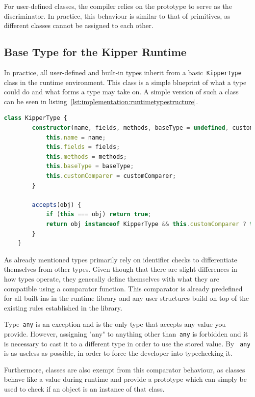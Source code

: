 For user-defined classes, the compiler relies on the prototype to serve as the discriminator. In practice, this behaviour is similar to that of primitives, as different classes cannot be assigned to each other.

\subsection{Base Type for the Kipper Runtime}
\label{subsec:basetype}

In practice, all user-defined and built-in types inherit from a basic~\lstinline|KipperType| class in the runtime environment. This class is a simple blueprint of what a type could do and what forms a type may take on. A simple version of such a class can be seen in listing~\ref{lst:implementation:runtimetypestructure}.

\begin{lstlisting}[language=TypeScript,caption=The structure of a runtime type,label=lst:implementation:runtimetypestructure]
	class KipperType {
		constructor(name, fields, methods, baseType = undefined, customComparer = undefined) {
			this.name = name;
			this.fields = fields;
			this.methods = methods;
			this.baseType = baseType;
			this.customComparer = customComparer;
		}

		accepts(obj) {
			if (this === obj) return true;
			return obj instanceof KipperType && this.customComparer ? this.customComparer(this, obj) : false;
		}
	}
\end{lstlisting}

As already mentioned types primarily rely on identifier checks to differentiate themselves from other types. Given though that there are slight differences in how types operate, they generally define themselves with what they are compatible using a comparator function. This comparator is already predefined for all built-ins in the runtime library and any user structures build on top of the existing rules established in the library.

Type~\lstinline|any| is an exception and is the only type that accepts any value you provide. However, assigning "any" to anything other than~\lstinline|any| is forbidden and it is necessary to cast it to a different type in order to use the stored value. By ~\lstinline|any| is as useless as possible, in order to force the developer into typechecking it.

Furthermore, classes are also exempt from this comparator behaviour, as classes behave like a value during runtime and provide a prototype which can simply be used to check if an object is an instance of that class.


